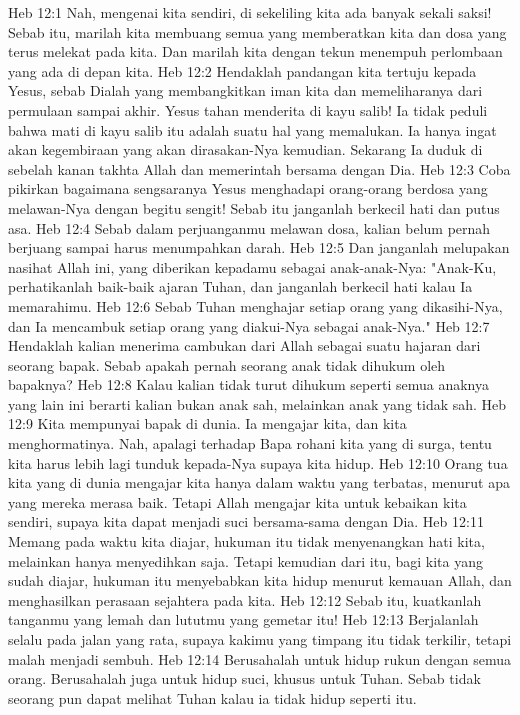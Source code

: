 Heb 12:1  Nah, mengenai kita sendiri, di sekeliling kita ada banyak sekali saksi! Sebab itu, marilah kita membuang semua yang memberatkan kita dan dosa yang terus melekat pada kita. Dan marilah kita dengan tekun menempuh perlombaan yang ada di depan kita.
Heb 12:2  Hendaklah pandangan kita tertuju kepada Yesus, sebab Dialah yang membangkitkan iman kita dan memeliharanya dari permulaan sampai akhir. Yesus tahan menderita di kayu salib! Ia tidak peduli bahwa mati di kayu salib itu adalah suatu hal yang memalukan. Ia hanya ingat akan kegembiraan yang akan dirasakan-Nya kemudian. Sekarang Ia duduk di sebelah kanan takhta Allah dan memerintah bersama dengan Dia.
Heb 12:3  Coba pikirkan bagaimana sengsaranya Yesus menghadapi orang-orang berdosa yang melawan-Nya dengan begitu sengit! Sebab itu janganlah berkecil hati dan putus asa.
Heb 12:4  Sebab dalam perjuanganmu melawan dosa, kalian belum pernah berjuang sampai harus menumpahkan darah.
Heb 12:5  Dan janganlah melupakan nasihat Allah ini, yang diberikan kepadamu sebagai anak-anak-Nya: "Anak-Ku, perhatikanlah baik-baik ajaran Tuhan, dan janganlah berkecil hati kalau Ia memarahimu.
Heb 12:6  Sebab Tuhan menghajar setiap orang yang dikasihi-Nya, dan Ia mencambuk setiap orang yang diakui-Nya sebagai anak-Nya."
Heb 12:7  Hendaklah kalian menerima cambukan dari Allah sebagai suatu hajaran dari seorang bapak. Sebab apakah pernah seorang anak tidak dihukum oleh bapaknya?
Heb 12:8  Kalau kalian tidak turut dihukum seperti semua anaknya yang lain ini berarti kalian bukan anak sah, melainkan anak yang tidak sah.
Heb 12:9  Kita mempunyai bapak di dunia. Ia mengajar kita, dan kita menghormatinya. Nah, apalagi terhadap Bapa rohani kita yang di surga, tentu kita harus lebih lagi tunduk kepada-Nya supaya kita hidup.
Heb 12:10  Orang tua kita yang di dunia mengajar kita hanya dalam waktu yang terbatas, menurut apa yang mereka merasa baik. Tetapi Allah mengajar kita untuk kebaikan kita sendiri, supaya kita dapat menjadi suci bersama-sama dengan Dia.
Heb 12:11  Memang pada waktu kita diajar, hukuman itu tidak menyenangkan hati kita, melainkan hanya menyedihkan saja. Tetapi kemudian dari itu, bagi kita yang sudah diajar, hukuman itu menyebabkan kita hidup menurut kemauan Allah, dan menghasilkan perasaan sejahtera pada kita.
Heb 12:12  Sebab itu, kuatkanlah tanganmu yang lemah dan lututmu yang gemetar itu!
Heb 12:13  Berjalanlah selalu pada jalan yang rata, supaya kakimu yang timpang itu tidak terkilir, tetapi malah menjadi sembuh.
Heb 12:14  Berusahalah untuk hidup rukun dengan semua orang. Berusahalah juga untuk hidup suci, khusus untuk Tuhan. Sebab tidak seorang pun dapat melihat Tuhan kalau ia tidak hidup seperti itu.
